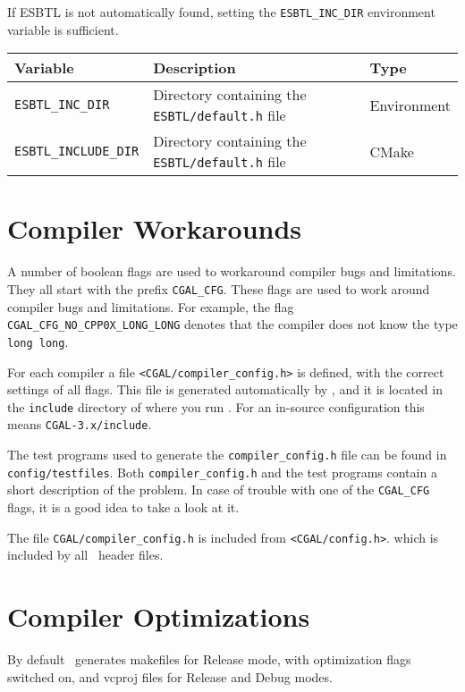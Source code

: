 If ESBTL is not automatically found, setting the \texttt{ESBTL\_INC\_DIR} 
environment variable is sufficient.

{\ccTexHtml{\small}{}
\renewcommand{\arraystretch}{1.3}
\gdef\lcTabularBorder{2}
\begin{tabular}{|l|l|l|} \hline
  \textbf{Variable}                    & \textbf{Description}                                         & \textbf{Type}\\\hline\hline
  \texttt{ESBTL\_INC\_DIR}     & Directory containing the \texttt{ESBTL/default.h} file & Environment\\\hline
  \texttt{ESBTL\_INCLUDE\_DIR}     & Directory containing the \texttt{ESBTL/default.h} file & CMake\\\hline
\end{tabular}
}




\section{Compiler Workarounds}

A number of boolean flags are used to workaround compiler bugs and
limitations. They all  start
with the prefix \texttt{CGAL\_CFG}. These flags are used to work
around compiler bugs and limitations. For example, the flag
\texttt{CGAL\_CFG\_NO\_CPP0X\_LONG\_LONG} denotes that the compiler does not
know the type \texttt{long long}.

For each compiler a file \texttt{<CGAL/compiler\_config.h>}
 is defined, with the correct
settings of all flags. This file is generated automatically by 
\cmake, and it is located in the \texttt{include} directory of
where you run \cmake. For an in-source configuration this means
\texttt{CGAL-3.x/include}.

The test programs used to generate the \texttt{compiler\_config.h}
file can be found in \texttt{config/testfiles}.
 Both
\texttt{compiler\_config.h} and the test programs contain a short
description of the problem. In case of trouble with one of the
\texttt{CGAL\_CFG} flags, it is a good idea to take a look at it.

The file \texttt{CGAL/compiler\_config.h} is included from
\texttt{<CGAL/config.h>}.
which is included by all \cgal\ header files.

\section{Compiler Optimizations\label{sec:compiler-optimisations}}

By default \cmake\ generates makefiles for Release mode, with 
optimization flags switched on, and vcproj files for Release
and Debug modes.





